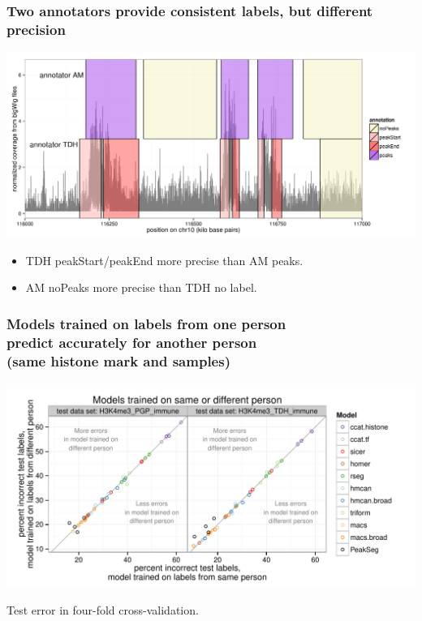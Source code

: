 \documentclass{beamer}
\begin{document}
\begin{frame}
  \frametitle{Two annotators provide consistent labels, but different
    precision}
  \includegraphics[width=1.1\textwidth]{screenshot-several-annotators}

  \begin{itemize}
  \item TDH peakStart/peakEnd more precise than AM peaks.
  \item AM noPeaks more precise than TDH no label.
  \end{itemize}
\end{frame}

\begin{frame}
  \frametitle{Models trained on labels from one person\\
predict accurately for another person\\
    (same histone mark and samples)}
  \includegraphics[width=1.1\textwidth]{figure-test-H3K4me3-annotators.pdf}

  Test error in four-fold cross-validation.
\end{frame}
\end{document}
